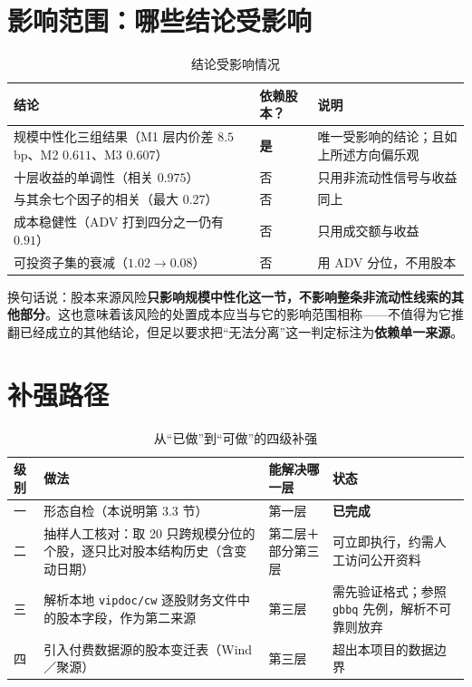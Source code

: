 \documentclass[11pt,a4paper]{ctexart}
\begin{document}
\section{影响范围：哪些结论受影响}

\begin{table}[htbp]
\centering
\caption{结论受影响情况}
\label{tab:scope}
\begin{tabular}{@{}>{\raggedright\arraybackslash}p{6.4cm}>{\raggedright\arraybackslash}p{1.8cm}>{\raggedright\arraybackslash}p{6.0cm}@{}}
\toprule
结论 & 依赖股本？ & 说明 \\
\midrule
规模中性化三组结果（M1 层内价差 $8.5$bp、M2 $0.611$、M3 $0.607$） & \textbf{是} & 唯一受影响的结论；且如上所述方向偏乐观 \\
十层收益的单调性（相关 $0.975$） & 否 & 只用非流动性信号与收益 \\
与其余七个因子的相关（最大 $0.27$） & 否 & 同上 \\
成本稳健性（ADV 打到四分之一仍有 $0.91$） & 否 & 只用成交额与收益 \\
可投资子集的衰减（$1.02 \to 0.08$） & 否 & 用 ADV 分位，不用股本 \\
\bottomrule
\end{tabular}
\end{table}

换句话说：股本来源风险\textbf{只影响规模中性化这一节，不影响整条非流动性线索的其他部分}。这也意味着该风险的处置成本应当与它的影响范围相称——不值得为它推翻已经成立的其他结论，但足以要求把“无法分离”这一判定标注为\textbf{依赖单一来源}。

\section{补强路径}

\begin{table}[htbp]
\centering
\caption{从“已做”到“可做”的四级补强}
\label{tab:fix}
\begin{tabular}{@{}>{\raggedright\arraybackslash}p{1.4cm}>{\raggedright\arraybackslash}p{4.4cm}>{\raggedright\arraybackslash}p{4.0cm}>{\raggedright\arraybackslash}p{3.0cm}@{}}
\toprule
级别 & 做法 & 能解决哪一层 & 状态 \\
\midrule
一 & 形态自检（本说明第 3.3 节） & 第一层 & \textbf{已完成} \\
二 & 抽样人工核对：取 20 只跨规模分位的个股，逐只比对股本结构历史（含变动日期） & 第二层＋部分第三层 & 可立即执行，约需人工访问公开资料 \\
三 & 解析本地 \texttt{vipdoc/cw} 逐股财务文件中的股本字段，作为第二来源 & 第三层 & 需先验证格式；参照 \texttt{gbbq} 先例，解析不可靠则放弃 \\
四 & 引入付费数据源的股本变迁表（Wind／聚源） & 第三层 & 超出本项目的数据边界 \\
\bottomrule
\end{tabular}
\end{table}
\end{document}
